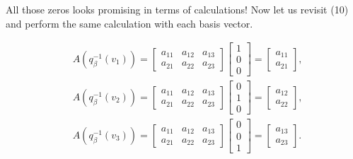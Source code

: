 \documentclass[12pt, a4paper]{article}
\begin{document}
 \vspace{8mm}
 
 \noindent All those zeros looks promising in terms of calculations! Now let us revisit (10) and perform the same calculation with each basis vector.
 
 \newpage
 
 \begin{equation}
    \begin{split}
        &A(q_{\beta}^{-1}(v_1))=\begin{bmatrix} a_{11} & a_{12} & a_{13} \\ a_{21} & a_{22} & a_{23} \end{bmatrix}\begin{bmatrix} 1 \\ 0 \\ 0 \end{bmatrix}=\begin{bmatrix} a_{11} \\ a_{21} \end{bmatrix}, \\
        &A(q_{\beta}^{-1}(v_2))=\begin{bmatrix} a_{11} & a_{12} & a_{13} \\ a_{21} & a_{22} & a_{23} \end{bmatrix}\begin{bmatrix} 0 \\ 1 \\ 0 \end{bmatrix}=\begin{bmatrix} a_{12} \\ a_{22} 
        \end{bmatrix}, \\
        &A(q_{\beta}^{-1}(v_3))=\begin{bmatrix} a_{11} & a_{12} & a_{13} \\ a_{21} & a_{22} & a_{23} \end{bmatrix}\begin{bmatrix} 0 \\ 0 \\ 1 \end{bmatrix}=\begin{bmatrix} a_{13} \\ a_{23} \end{bmatrix}.
    \end{split}
 \end{equation}
 
 \vspace{2mm}
 
\end{document}
